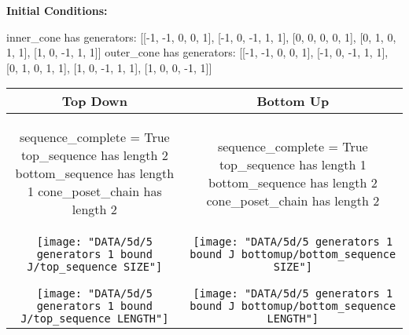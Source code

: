 \documentclass[10pt]{article}
\begin{document}
\textbf{Initial Conditions:}
\begin{SAGE}
inner_cone has generators: 
[[-1, -1, 0, 0, 1], [-1, 0, -1, 1, 1], [0, 0, 0, 0, 1], [0, 1, 0, 1, 1], [1, 0, -1, 1, 1]]
outer_cone has generators: 
[[-1, -1, 0, 0, 1], [-1, 0, -1, 1, 1], [0, 1, 0, 1, 1], [1, 0, -1, 1, 1], [1, 0, 0, -1, 1]]

\end{SAGE}
\begin{tabular}{c|c}
\textbf{Top Down} & \textbf{Bottom Up} \\ \hline  
\begin{SAGE}
sequence_complete = True
top_sequence has length 2
bottom_sequence has length 1
cone_poset_chain has length 2
\end{SAGE} 
&
\begin{SAGE}
sequence_complete = True
top_sequence has length 1
bottom_sequence has length 2
cone_poset_chain has length 2
\end{SAGE} 
\\ \hline

\begin{minipage}{.4\textwidth}
\texttt{[image: "DATA/5d/5 generators 1 bound J/top\_sequence SIZE"]}
\end{minipage} &
\begin{minipage}{.4\textwidth}
\texttt{[image: "DATA/5d/5 generators 1 bound J bottomup/bottom\_sequence SIZE"]}
\end{minipage} \\ \\
\hline \\\begin{minipage}{.4\textwidth}
\texttt{[image: "DATA/5d/5 generators 1 bound J/top\_sequence LENGTH"]}
\end{minipage} &
\begin{minipage}{.4\textwidth}
\texttt{[image: "DATA/5d/5 generators 1 bound J bottomup/bottom\_sequence LENGTH"]}
\end{minipage}
\end{tabular}
\end{document}
